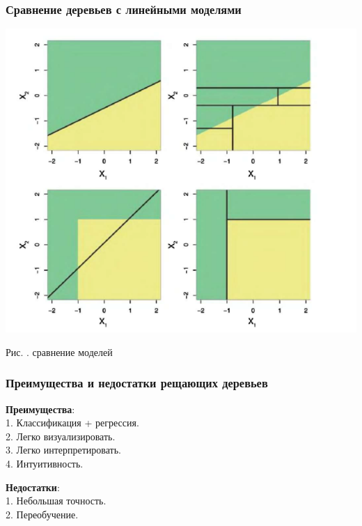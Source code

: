 \documentclass[pdf, 9pt, usenames, dvipsnames, unicode, hyperref={bookmarks=true,bookmarksopen=false, bookmarksnumbered}]{beamer}
\begin{document}
\begin{frame}\frametitle{Сравнение деревьев с линейными моделями}

\begin{center}
	\includegraphics[scale=0.4]{pic10}
\end{center}
\begin{center}
	Рис. . сравнение моделей
\end{center}
\end{frame}


\begin{frame}\frametitle{Преимущества и недостатки рещающих деревьев}

\textbf{Преимущества}:\\
1. Классификация + регрессия.\\
2. Легко визуализировать.\\
3. Легко интерпретировать.\\
4. Интуитивность.

\textbf{Недостатки}:\\
1. Небольшая точность.\\
2. Переобучение.

\end{frame}

\end{document}

